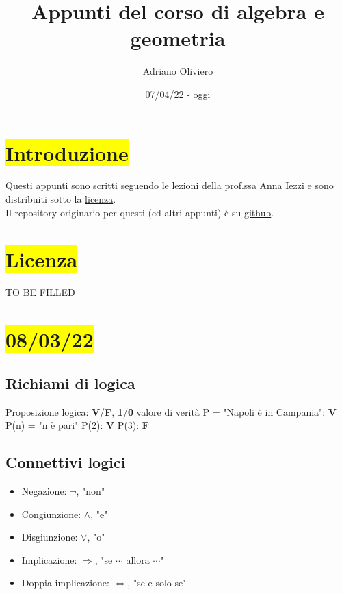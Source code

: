 \documentclass{article}
\title{Appunti del corso di algebra e geometria}
\author{Adriano Oliviero}
\date{07/04/22 - oggi}
\begin{document}
\newcommand{\hl}[1]{\colorbox{yellow}{#1}}
\newcommand{\ul}[1]{\underline{#1}}
\newcommand{\Def}[2]{\paragraph{\ul{Def}:}#1\\\hspace*{3em}\begin{minipage}{.8\textwidth}#2\end{minipage}}
\newcommand{\Esempio}[1]{\subsubsection*{\ul{Esempio}:}#1}
\newcommand{\R}{\mathbb{R}}
\maketitle
\section*{\hl{Introduzione}}
Questi appunti sono scritti seguendo le lezioni della prof.ssa \href{https://aiezzi.it/}{Anna Iezzi} e sono distribuiti sotto la \hyperref[sec:Licenza]{licenza}.\\
Il repository originario per questi (ed altri appunti) è su \href{https://github.com/TheDarkBug/notes}{github}.

\section*{\hl{Licenza}}
\label{sec:Licenza}
TO BE FILLED
\section{\hl{08/03/22}}
\subsection*{Richiami di logica}
Proposizione logica: \textbf{V}/\textbf{F}, \textbf{1}/\textbf{0} valore di verità
P = "Napoli è in Campania": \textbf{V}
P(n) = "n è pari"
P(2): \textbf{V}
P(3): \textbf{F}
\subsection*{Connettivi logici}
\begin{itemize}
	\item Negazione: $\neg$, "non"
	\item Congiunzione: $\wedge$, "e"
	\item Disgiunzione: $\vee$, "o"
	\item Implicazione: $\Rightarrow$, "se $\cdots$ allora $\cdots$"
	\item Doppia implicazione: $\Leftrightarrow$, "se e solo se"
\end{itemize}
\end{document}
